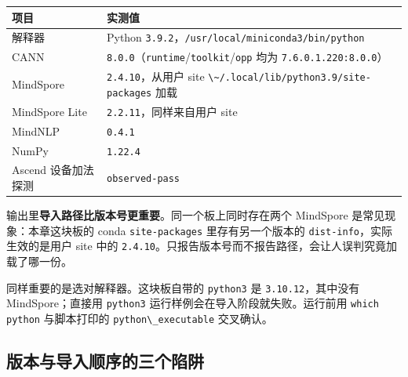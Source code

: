 \begin{longtable}[]{@{}
  >{\raggedright\arraybackslash}p{}
  >{\raggedright\arraybackslash}p{}@{}}
\toprule\noalign{}
\begin{minipage}[b]{\linewidth}\raggedright
项目
\end{minipage} & \begin{minipage}[b]{\linewidth}\raggedright
实测值
\end{minipage} \\
\midrule\noalign{}
\endhead
\bottomrule\noalign{}
\endlastfoot
解释器 & Python
\passthrough{\lstinline!3.9.2!}，\passthrough{\lstinline!/usr/local/miniconda3/bin/python!} \\
CANN &
\passthrough{\lstinline!8.0.0!}（\passthrough{\lstinline!runtime!}/\passthrough{\lstinline!toolkit!}/\passthrough{\lstinline!opp!}
均为 \passthrough{\lstinline!7.6.0.1.220:8.0.0!}） \\
MindSpore & \passthrough{\lstinline!2.4.10!}，从用户 site
\passthrough{\lstinline!\~/.local/lib/python3.9/site-packages!} 加载 \\
MindSpore Lite & \passthrough{\lstinline!2.2.11!}，同样来自用户 site \\
MindNLP & \passthrough{\lstinline!0.4.1!} \\
NumPy & \passthrough{\lstinline!1.22.4!} \\
Ascend 设备加法探测 & \passthrough{\lstinline!observed-pass!} \\
\end{longtable}

输出里\textbf{导入路径比版本号更重要}。同一个板上同时存在两个 MindSpore
是常见现象：本章这块板的 conda \passthrough{\lstinline!site-packages!}
里存有另一个版本的 \passthrough{\lstinline!dist-info!}，实际生效的是用户
site 中的
\passthrough{\lstinline!2.4.10!}。只报告版本号而不报告路径，会让人误判究竟加载了哪一份。

同样重要的是选对解释器。这块板自带的 \passthrough{\lstinline!python3!}
是 \passthrough{\lstinline!3.10.12!}，其中没有 MindSpore；直接用
\passthrough{\lstinline!python3!} 运行样例会在导入阶段就失败。运行前用
\passthrough{\lstinline!which python!} 与脚本打印的
\passthrough{\lstinline!python\_executable!} 交叉确认。

\subsection{版本与导入顺序的三个陷阱}\label{src-book-chapter5-h8}

